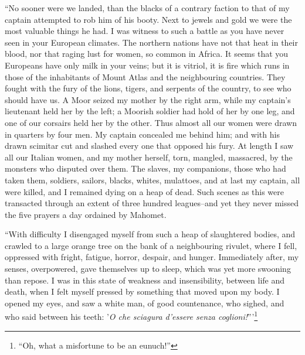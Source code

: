 ``No sooner were we landed, than the blacks of a contrary faction to that of my captain attempted to rob him of his booty. Next to jewels and gold we were the most valuable things he had. I was witness to such a battle as you have never seen in your European climates. The northern nations have not that heat in their blood, nor that raging lust for women, so common in Africa. It seems that you Europeans have only milk in your veins; but it is vitriol, it is fire which runs in those of the inhabitants of Mount Atlas and the neighbouring countries. They fought with the fury of the lions, tigers, and serpents of the country, to see who should have us. A Moor seized my mother by the right arm, while my captain's lieutenant held her by the left; a Moorish soldier had hold of her by one leg, and one of our corsairs held her by the other. Thus almost all our women were drawn in quarters by four men. My captain concealed me behind him; and with his drawn scimitar cut and slashed every one that opposed his fury. At length I saw all our Italian women, and my mother herself, torn, mangled, massacred, by the monsters who disputed over them. The slaves, my companions, those who had taken them, soldiers, sailors, blacks, whites, mulattoes, and at last my captain, all were killed, and I remained dying on a heap of dead. Such scenes as this were transacted through an extent of three hundred leagues--and yet they never missed the five prayers a day ordained by Mahomet.

``With difficulty I disengaged myself from such a heap of slaughtered bodies, and crawled to a large orange tree on the bank of a neighbouring rivulet, where I fell, oppressed with fright, fatigue, horror, despair, and hunger. Immediately after, my senses, overpowered, gave themselves up to sleep, which was yet more swooning than repose. I was in this state of weakness and insensibility, between life and death, when I felt myself pressed by something that moved upon my body. I opened my eyes, and saw a white man, of good countenance, who sighed, and who said between his teeth: '\textit{O che sciagura d'essere senza coglioni!}'''\footnote{``Oh, what a misfortune to be an eunuch!''}


